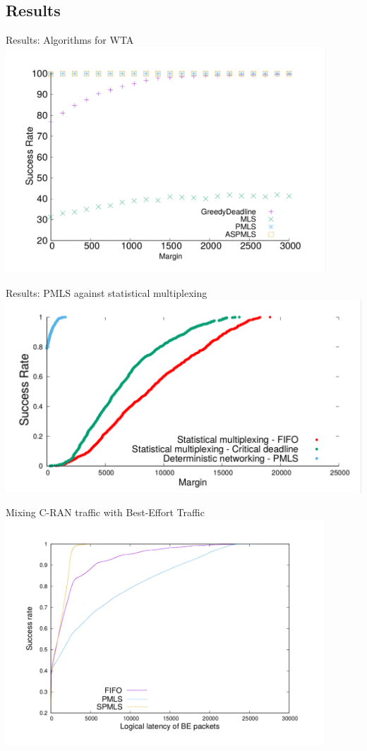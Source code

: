 \documentclass[10 pt]{beamer}
\begin{document}
\subsection{Results}
\begin{frame}{Results: Algorithms for WTA}
\centering
\includegraphics[width=0.9\textwidth]{retour_210002.pdf}

\end{frame}
\begin{frame}{Results: PMLS against statistical multiplexing}
\centering
\includegraphics[width=\textwidth]{stochastic2.pdf}
\end{frame}


\begin{frame}{Mixing C-RAN traffic with Best-Effort Traffic}
\centering
\includegraphics[width=0.9\textwidth]{res.pdf}

\end{frame}
\end{document}
